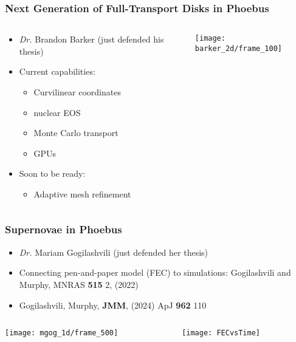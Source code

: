 \documentclass[]{beamer}
\begin{document}
\begin{frame}
  \frametitle{Next Generation of Full-Transport Disks in Phoebus}
  \begin{columns}
    \begin{column}{6cm}
      \begin{itemize}
      \item \textit{Dr.} Brandon Barker (just defended his thesis)
      \item Current capabilities:
        \begin{itemize}
        \item Curvilinear coordinates
        \item nuclear EOS
        \item Monte Carlo transport
        \item GPUs
        \end{itemize}
      \item Soon to be ready:
        \begin{itemize}
        \item Adaptive mesh refinement
        \end{itemize}
      \end{itemize}
    \end{column}
    \begin{column}{6cm}
      \begin{center}
        \texttt{[image: barker\_2d/frame\_100]}
      \end{center}
    \end{column}
  \end{columns}
\end{frame}

\begin{frame}
  \frametitle{Supernovae in Phoebus}
  \begin{itemize}
  \item \textit{Dr.} Mariam Gogilashvili (just defended her thesis)
  \item Connecting pen-and-paper model (FEC) to simulations: Gogilashvili and Murphy, MNRAS \textbf{515} 2, (2022)
  \item Gogilashvili, Murphy, \textbf{JMM}, (2024) ApJ \textbf{962} 110
  \end{itemize}
  \begin{columns}
    \begin{column}{6cm}
      \begin{center}
        \texttt{[image: mgog\_1d/frame\_500]}
      \end{center}
    \end{column}
    \begin{column}{6cm}
      \begin{center}
        \texttt{[image: FECvsTime]}
      \end{center}
    \end{column}
  \end{columns}
\end{frame}
\end{document}
